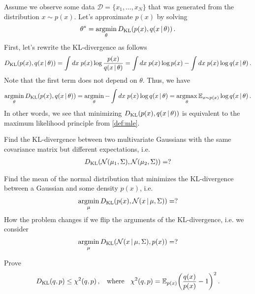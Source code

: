 \begin{example}\label{example:variational_mle}
    Assume we observe some data $\mathcal{D} = \{x_1,\ldots, x_N\}$ that was generated from the distribution $x \sim p(x)$.
    Let's approximate $p(x)$ by solving
    \begin{align}
        \theta^* = \operatorname*{argmin}_\theta D_{\mathrm{KL}}(p(x),q(x\,|\,\theta))\,.
    \end{align}
    First, let's rewrite the KL-divergence as follows
    \begin{align}
        D_{\mathrm{KL}}(p(x),q(x\,|\,\theta)) = \int dx\; p(x)\log\frac{p(x)}{q(x\,|\,\theta)} = \int dx\; p(x)\log p(x) - \int dx\; p(x)\log q(x\,|\,\theta)\,.
    \end{align}
    Note that the first term does not depend on $\theta$. Thus, we have
    \begin{align}
        \operatorname*{argmin}_\theta D_{\mathrm{KL}}(p(x),q(x\,|\,\theta)) = \operatorname*{argmin}_\theta - \int dx\; p(x)\log q(x\,|\,\theta) = \operatorname*{argmax}_\theta \mathbb{E}_{x\sim p(x)} \log q(x\,|\,\theta)\,.
    \end{align}
    In other words, we see that minimizing $D_{\mathrm{KL}}(p(x),q(x\,|\,\theta))$ is equivalent to the maximum likelihood principle from \cref{def:mle}.
\end{example}
    
\begin{exercise}
    Find the KL-divergence between two multivariate Gaussians with the same covariance matrix but different expectations, i.e.
    \begin{align}
        D_{\mathrm{KL}}(\mathcal{N}(\mu_1,\Sigma), \mathcal{N}(\mu_2,\Sigma)) = ?
    \end{align}
\end{exercise}

\begin{exercise}
    Find the mean of the normal distribution that minimizes the KL-divergence between a Gaussian and some density $p(x)$, i.e.
    \begin{align}
        \operatorname*{argmin}_\mu D_{\mathrm{KL}}(p(x), \mathcal{N}(x\,|\, \mu,\Sigma)) = ?
    \end{align}
    How the problem changes if we flip the arguments of the KL-divergence, i.e. we consider
    \begin{align}
        \operatorname*{argmin}_\mu D_{\mathrm{KL}}(\mathcal{N}(x\,|\, \mu,\Sigma),p(x)) = ?
    \end{align}
\end{exercise}

\begin{exercise}
    Prove
    \begin{align}
        \KL(q,p) \leq \chi^2(q,p)\,,\;\; \text{ where }\;\;\chi^2(q,p) = \mean_{p(x)} \left(\frac{q(x)}{p(x)}-1\right)^2\,.
    \end{align}
\end{exercise}

